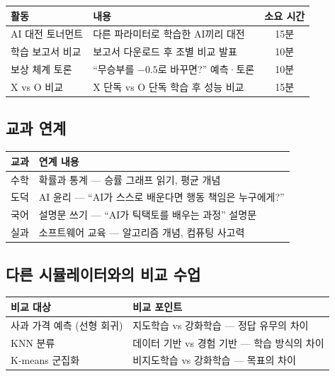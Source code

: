 \documentclass[11pt,a4paper]{article}
\begin{document}
\begin{center}
\renewcommand{\arraystretch}{1.4}
\begin{tabular}{|l|p{6cm}|c|}
\hline
\rowcolor{tableheader}
\textbf{활동} & \textbf{내용} & \textbf{소요 시간} \\
\hline
AI 대전 토너먼트 & 다른 파라미터로 학습한 AI끼리 대전 & 15분 \\
\hline
학습 보고서 비교 & 보고서 다운로드 후 조별 비교 발표 & 10분 \\
\hline
보상 체계 토론 & ``무승부를 $-0.5$로 바꾸면?'' 예측·토론 & 10분 \\
\hline
X vs O 비교 & X 단독 vs O 단독 학습 후 성능 비교 & 15분 \\
\hline
\end{tabular}
\end{center}

\subsection{교과 연계}

\begin{center}
\renewcommand{\arraystretch}{1.4}
\begin{tabular}{|l|p{9cm}|}
\hline
\rowcolor{tableheader}
\textbf{교과} & \textbf{연계 내용} \\
\hline
수학 & 확률과 통계 — 승률 그래프 읽기, 평균 개념 \\
\hline
도덕 & AI 윤리 — ``AI가 스스로 배운다면 행동 책임은 누구에게?'' \\
\hline
국어 & 설명문 쓰기 — ``AI가 틱택토를 배우는 과정'' 설명문 \\
\hline
실과 & 소프트웨어 교육 — 알고리즘 개념, 컴퓨팅 사고력 \\
\hline
\end{tabular}
\end{center}

\subsection{다른 시뮬레이터와의 비교 수업}

\begin{center}
\renewcommand{\arraystretch}{1.4}
\begin{tabular}{|l|p{8cm}|}
\hline
\rowcolor{tableheader}
\textbf{비교 대상} & \textbf{비교 포인트} \\
\hline
사과 가격 예측 (선형 회귀) & 지도학습 vs 강화학습 — 정답 유무의 차이 \\
\hline
KNN 분류 & 데이터 기반 vs 경험 기반 — 학습 방식의 차이 \\
\hline
K-means 군집화 & 비지도학습 vs 강화학습 — 목표의 차이 \\
\hline
\end{tabular}
\end{center}
\end{document}
